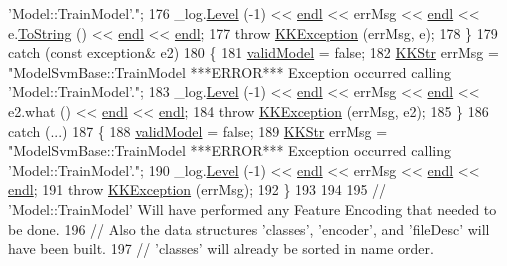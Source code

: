 \begin{DoxyCode}
{       'Model::TrainModel'."};
176     \_log.\hyperlink{class_k_k_b_1_1_run_log_a32cf761d7f2e747465fd80533fdbb659}{Level} (-1) << \hyperlink{namespace_k_k_b_ad1f50f65af6adc8fa9e6f62d007818a8}{endl} << errMsg << \hyperlink{namespace_k_k_b_ad1f50f65af6adc8fa9e6f62d007818a8}{endl} << e.\hyperlink{class_k_k_b_1_1_k_k_exception_a9d565e887e90968c5e306c1ea94c6894}{ToString} () << 
      \hyperlink{namespace_k_k_b_ad1f50f65af6adc8fa9e6f62d007818a8}{endl} << \hyperlink{namespace_k_k_b_ad1f50f65af6adc8fa9e6f62d007818a8}{endl};
177     \textcolor{keywordflow}{throw}  \hyperlink{class_k_k_b_1_1_k_k_exception}{KKException} (errMsg, e);
178   \}
179   \textcolor{keywordflow}{catch} (\textcolor{keyword}{const} exception& e2)
180   \{
181     \hyperlink{class_k_k_m_l_l_1_1_model_af881a051b703412686fa3b4a62b6d68a}{validModel} = \textcolor{keyword}{false};
182     \hyperlink{class_k_k_b_1_1_k_k_str}{KKStr} errMsg = \textcolor{stringliteral}{"ModelSvmBase::TrainModel  ***ERROR*** Exception occurred calling
       'Model::TrainModel'."};
183     \_log.\hyperlink{class_k_k_b_1_1_run_log_a32cf761d7f2e747465fd80533fdbb659}{Level} (-1) << \hyperlink{namespace_k_k_b_ad1f50f65af6adc8fa9e6f62d007818a8}{endl} << errMsg << \hyperlink{namespace_k_k_b_ad1f50f65af6adc8fa9e6f62d007818a8}{endl} << e2.what () << \hyperlink{namespace_k_k_b_ad1f50f65af6adc8fa9e6f62d007818a8}{endl} << 
      \hyperlink{namespace_k_k_b_ad1f50f65af6adc8fa9e6f62d007818a8}{endl};
184     \textcolor{keywordflow}{throw} \hyperlink{class_k_k_b_1_1_k_k_exception}{KKException} (errMsg, e2);
185   \}
186   \textcolor{keywordflow}{catch} (...)
187   \{
188     \hyperlink{class_k_k_m_l_l_1_1_model_af881a051b703412686fa3b4a62b6d68a}{validModel} = \textcolor{keyword}{false};
189     \hyperlink{class_k_k_b_1_1_k_k_str}{KKStr} errMsg = \textcolor{stringliteral}{"ModelSvmBase::TrainModel  ***ERROR*** Exception occurred calling
       'Model::TrainModel'."};
190     \_log.\hyperlink{class_k_k_b_1_1_run_log_a32cf761d7f2e747465fd80533fdbb659}{Level} (-1) << \hyperlink{namespace_k_k_b_ad1f50f65af6adc8fa9e6f62d007818a8}{endl} << errMsg << \hyperlink{namespace_k_k_b_ad1f50f65af6adc8fa9e6f62d007818a8}{endl} << \hyperlink{namespace_k_k_b_ad1f50f65af6adc8fa9e6f62d007818a8}{endl};
191     \textcolor{keywordflow}{throw} \hyperlink{class_k_k_b_1_1_k_k_exception}{KKException} (errMsg);
192   \}
193     
194 
195   \textcolor{comment}{// 'Model::TrainModel'  Will have performed any Feature Encoding that needed to be done.  }
196   \textcolor{comment}{// Also the data structures 'classes', 'encoder', and 'fileDesc' will have been built.}
197   \textcolor{comment}{// 'classes' will already be sorted in name order.}

\end{DoxyCode}
